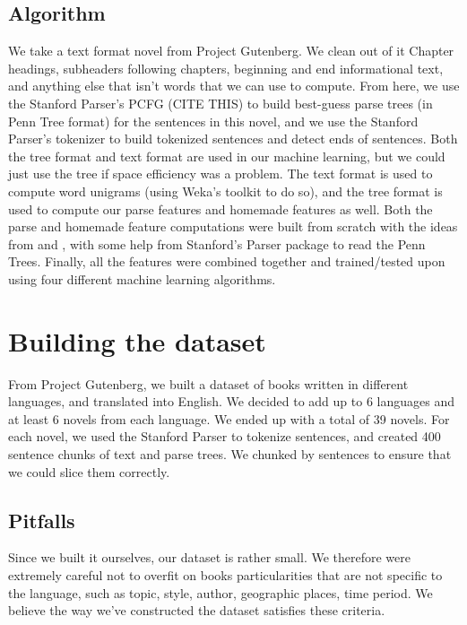 \documentclass[10pt]{article}
\begin{document}
\subsection{Algorithm}
We take a text format novel from Project Gutenberg. We clean out of it Chapter headings, subheaders following chapters, beginning and end informational text, and anything else that isn't words that we can use to compute. From here, we use the Stanford Parser's PCFG (CITE THIS) to build best-guess parse trees (in Penn Tree format) for the sentences in this novel, and we use the Stanford Parser's tokenizer to build tokenized sentences and detect ends of sentences. Both the tree format and text format are used in our machine learning, but we could just use the tree if space efficiency was a problem. The text format is used to compute word unigrams (using Weka's toolkit to do so), and the tree format is used to compute our parse features and homemade features as well. Both the parse and homemade feature computations were built from scratch with the ideas from  \cite{homemade} and  \cite{Parse}, with some help from Stanford's Parser package to read the Penn Trees. Finally, all the features were combined together and trained/tested upon using four different machine learning algorithms.



\section{Building the dataset}
From Project Gutenberg, we built a dataset of books written in different languages, and translated into English. We decided to add up to 6 languages and at least 6 novels from each language. We ended up with a total of 39 novels. For each novel, we used the Stanford Parser to tokenize sentences, and created 400 sentence chunks of text and parse trees. We chunked by sentences to ensure that we could slice them correctly. 
\subsection{Pitfalls}
Since we built it ourselves, our dataset is rather small. We therefore were extremely careful not to overfit on books particularities that are not specific to the language, such as topic, style, author, geographic places, time period. We believe the way we've constructed the dataset satisfies these criteria. 
\end{document}

